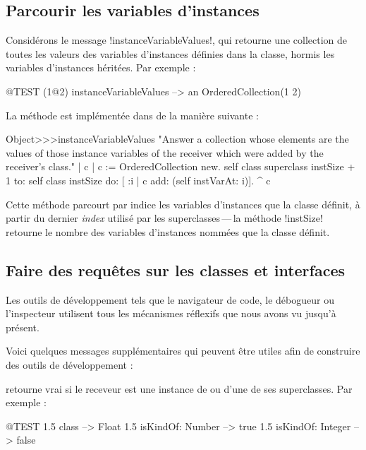 \documentclass[a4paper,10pt,twoside]{book}
\begin{document}
\subsection{Parcourir les variables d'instances}

Considérons le message \ct!instanceVariableValues!, qui retourne une collection de toutes les valeurs des variables d'instances définies dans la classe, hormis les variables d'instances héritées.
Par exemple :
\begin{code}{@TEST}
(1@2) instanceVariableValues --> an OrderedCollection(1 2)
\end{code}

\noindent{} La méthode est implémentée dans  de la manière suivante :
\begin{code}{}
Object>>>instanceVariableValues
	"Answer a collection whose elements are the values of those instance variables of the receiver which were added by the receiver's class."	
	| c |
	c := OrderedCollection new.
	self class superclass instSize + 1
		to: self class instSize
		do: [ :i | c add: (self instVarAt: i)].
	^ c
\end{code}

Cette méthode parcourt par indice les variables d'instances que la classe définit, à partir du dernier \emph{index} utilisé par les superclasses\,---\,la méthode \ct!instSize! retourne le nombre des variables d'instances nommées que la classe définit.

\subsection{Faire des requêtes sur les classes et interfaces}

Les outils de développement \pharo tels que le navigateur de code, le débogueur ou l'inspecteur utilisent tous les mécanismes réflexifs que nous avons vu jusqu'à présent.

Voici quelques messages supplémentaires qui peuvent être utiles afin de construire des outils de développement :

 retourne vrai si le receveur est une instance de  ou d'une de ses superclasses.
Par exemple :
\begin{code}{@TEST}
1.5 class                     --> Float
1.5 isKindOf: Number --> true
1.5 isKindOf: Integer   --> false
\end{code}
\end{document}
